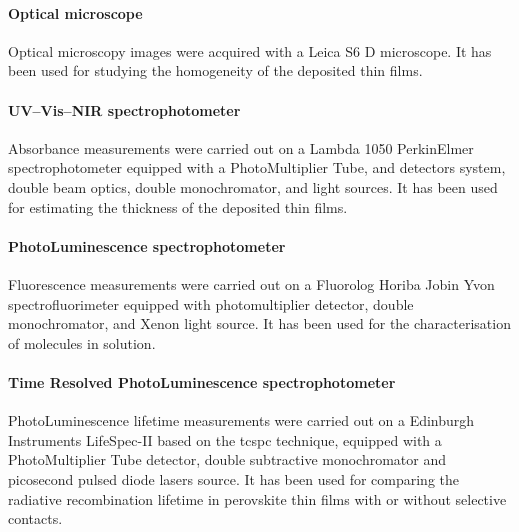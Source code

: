 		\paragraph{Optical microscope}
		Optical microscopy images were acquired with a Leica S6 D microscope.
		It has been used for studying the homogeneity of the deposited thin films.

		\paragraph{UV--Vis--NIR spectrophotometer}
		Absorbance measurements were carried out on a Lambda 1050 PerkinElmer spectrophotometer equipped with a PhotoMultiplier Tube,  and  detectors system, double beam optics, double monochromator,  and  light sources.
		It has been used for estimating the thickness of the deposited thin films.

		\paragraph{PhotoLuminescence spectrophotometer}
		Fluorescence measurements were carried out on a Fluorolog Horiba Jobin Yvon spectrofluorimeter equipped with photomultiplier detector, double monochromator, and Xenon light source.
		It has been used for the characterisation of molecules in solution.

		\paragraph{Time Resolved PhotoLuminescence spectrophotometer}
		PhotoLuminescence lifetime measurements were carried out on a Edinburgh Instruments LifeSpec-II based on the \gls{tcspc} technique, equipped with a PhotoMultiplier Tube detector, double subtractive monochromator and picosecond pulsed diode lasers source.
		It has been used for comparing the radiative recombination lifetime in perovskite thin films with or without selective contacts.

